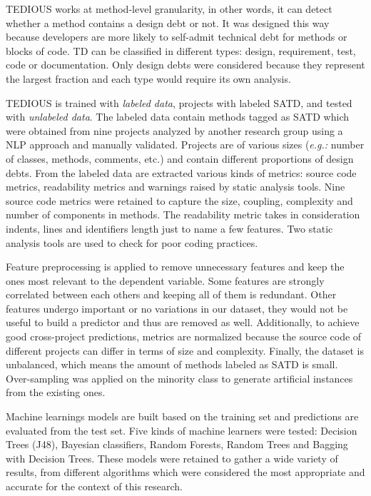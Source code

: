 \ac{TEDIOUS} works at method-level granularity, in other words, it can detect whether a method contains a design debt or not. It was designed this way because developers are more likely to self-admit technical debt for methods or blocks of code. \ac{TD} can be classified in different types: design, requirement, test, code or documentation. Only design debts were considered because they represent the largest fraction and each type would require its own analysis.  \par

\ac{TEDIOUS} is trained with \emph{labeled data}, projects with labeled \ac{SATD}, and tested with \emph{unlabeled data}. The labeled data contain methods tagged as \ac{SATD} which were obtained from nine projects analyzed by another research group using a \ac{NLP} approach and manually validated. Projects are of various sizes (\emph{e.g.:} number of classes, methods, comments, etc.) and contain different proportions of design debts. From the labeled data are extracted various kinds of metrics: source code metrics, readability metrics and warnings raised by static analysis tools. Nine source code metrics were retained to capture the size, coupling, complexity and number of components in methods. The readability metric takes in consideration indents, lines and identifiers length just to name a few features. Two static analysis tools are used to check for poor coding practices. \par

Feature preprocessing is applied to remove unnecessary features and keep the ones most relevant to the dependent variable. Some features are strongly correlated between each others and keeping all of them is redundant. Other features undergo important or no variations in our dataset, they would not be useful to build a predictor and thus are removed as well. Additionally, to achieve good cross-project predictions, metrics are normalized because the source code of different projects can differ in terms of size and complexity. Finally, the dataset is unbalanced, which means the amount of methods labeled as \ac{SATD} is small. Over-sampling was applied on the minority class to generate artificial instances from the existing ones. \par

Machine learnings models are built based on the training set and predictions are evaluated from the test set. Five kinds of machine learners were tested: Decision Trees (J48), Bayesian classifiers, Random Forests, Random Trees and Bagging with Decision Trees. These models were retained to gather a wide variety of results, from different algorithms which were considered the most appropriate and accurate for the context of this research. \par

